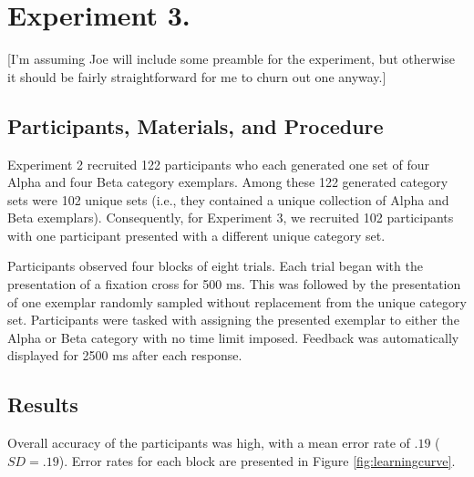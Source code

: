 

% 
\section{Experiment 3.}

[I'm assuming Joe will include some preamble for the experiment, but otherwise
it should be fairly straightforward for me to churn out one anyway.]

\subsection{Participants, Materials, and Procedure}

Experiment 2 recruited 122 participants who each generated one set of four Alpha
and four Beta category exemplars. Among these 122 generated category sets were
102 unique sets (i.e., they contained a unique collection of Alpha and Beta
exemplars). Consequently, for Experiment 3, we recruited 102 participants with
one participant presented with a different unique category set.

Participants observed four blocks of eight trials. Each trial began with the
presentation of a fixation cross for 500 ms. This was followed by the
presentation of one exemplar randomly sampled without replacement from the
unique category set. Participants were tasked with assigning the presented
exemplar to either the Alpha or Beta category with no time limit imposed.
Feedback was automatically displayed for 2500 ms after each response.

\subsection{Results}

Overall accuracy of the participants was high, with a mean error rate of $.19$
($SD = .19$). Error rates for each block are presented in Figure
\ref{fig:learningcurve}. 

